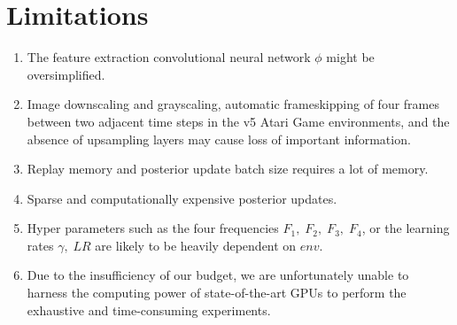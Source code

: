 \documentclass{article}
\begin{document}
\section{Limitations}
\begin{enumerate}
    \item The feature extraction convolutional neural network $\phi$ might be oversimplified.
    \item Image downscaling and grayscaling, automatic frameskipping of four frames between two adjacent time steps in the v5 Atari Game environments, and the absence of upsampling layers may cause loss of important information.
    \item Replay memory and posterior update batch size requires a lot of memory.
    \item Sparse and computationally expensive posterior updates.
    \item Hyper parameters such as the four frequencies $F_1,\;F_2,\;F_3,\;F_4$, or the learning rates $\gamma,\; LR$ are likely to be heavily dependent on $env$.
    \item Due to the insufficiency of our budget, we are unfortunately unable to harness the computing power of state-of-the-art GPUs to perform the exhaustive and time-consuming experiments.
\end{enumerate}

\clearpage
\end{document}
